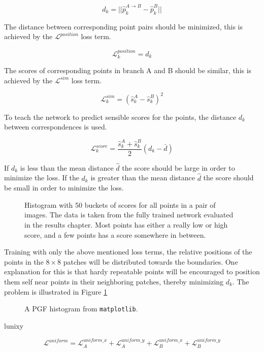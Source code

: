\[
d_k=||\hat{p}_k^{A\rightarrow B}-\hat{p}_k^B||
\]

The distance between corresponding point pairs should be minimized, this is achieved by the $\mathcal{L}^{position}$ loss term.

\[
\mathcal{L}_k^{position} = d_k
\]

The scores of corresponding points in branch A and B should be similar, this is achieved by the $\mathcal{L}^{sim}$ loss term.

\[
\mathcal{L}_k^{sim} = \left(\hat{s}_k^{A}-\hat{s}_k^B\right)^2
\]

To teach the network to predict sensible scores for the points, the distance $d_k$ between correspondences is used.

\[
\mathcal{L}_k^{score}=\frac{\hat{s}_k^A+\hat{s}_k^B}{2}\left(d_k-\bar{d}\right)
\]

If $d_k$ is less than the mean distance $\hat{d}$ the score should be large in order to minimize the loss. If the $d_k$ is greater than the mean distance $\hat{d}$ the score should be small in order to minimize the loss.

\begin{figure}[H]
	\begin{center}
		
	\end{center}
	\caption{Histogram with 50 buckets of scores for all points in a pair of images. The data is taken from the fully trained network evaluated in the results chapter. Most points has either a really low or high score, and a few points has a score somewhere in between.}
\end{figure}

Training with only the above mentioned loss terms, the relative positions of the points in the $8\times 8$ patches will be distributed towards the boundaries. One explanation for this is that hardy repeatable points will be encouraged to position them self near points in their neighboring patches, thereby minimizing $d_k$. The problem is illustrated in Figure \ref{fig:hist-no-unixy}

\begin{figure}[H]
	\begin{center}
		
	\end{center}
	\caption{A PGF histogram from \texttt{matplotlib}.}
	\label{fig:hist-no-unixy}
\end{figure}

lunixy


\[
\mathcal{L}^{uniform}=\mathcal{L}^{uniform\_x}_A+\mathcal{L}^{uniform\_y}_A+\mathcal{L}^{uniform\_x}_B+\mathcal{L}^{uniform\_y}_B
\]

